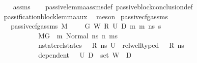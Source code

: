 \begin{isabellebody}
%
\isadelimproof
\ \ %
\endisadelimproof
%
\isatagproof
{}\isamarkupfalse%
\ assms\isanewline
\ \ \isamarkupfalse%
\ passive{\isacharunderscore}{\kern0pt}lemma{\isacharunderscore}{\kern0pt}assms{\isacharunderscore}{\kern0pt}def\ passive{\isacharunderscore}{\kern0pt}block{\isacharunderscore}{\kern0pt}conclusion{\isacharunderscore}{\kern0pt}def\isanewline
\ \ \isamarkupfalse%
\ passification{\isacharunderscore}{\kern0pt}block{\isacharunderscore}{\kern0pt}lemma{\isacharunderscore}{\kern0pt}aux\ \isamarkupfalse%
\ meson%
\endisatagproof
{\isafoldproof}%
%
\isadelimproof
%
\endisadelimproof
%
\isadelimdocument
%
\endisadelimdocument
%
\isatagdocument
%
\isamarkuptrue%
%
\endisatagdocument
{\isafolddocument}%
%
\isadelimdocument
%
\endisadelimdocument
{}\isamarkupfalse%
\ passive{\isacharunderscore}{\kern0pt}cfg{\isacharunderscore}{\kern0pt}assms\isanewline
\ \ \ {\isachardoublequoteopen}passive{\isacharunderscore}{\kern0pt}cfg{\isacharunderscore}{\kern0pt}assms\ M\ {\isasymLambda}\ {\isasymLambda}{\isacharprime}{\kern0pt}\ {\isasymGamma}\ {\isasymOmega}\ G\ W\ R\ U{}\ D{}\ m\ m{\isacharprime}{\kern0pt}\ ns\ s{\isacharprime}{\kern0pt}\ {\isacharequal}{\kern0pt}\ \isanewline
\ \ \ \ \ \ \ \ \ \ {\isacharparenleft}{\kern0pt}\ {\isacharparenleft}{\kern0pt}M{\isacharcomma}{\kern0pt}{\isasymLambda}{\isacharcomma}{\kern0pt}{\isasymGamma}{\isacharcomma}{\kern0pt}{\isasymOmega}{\isacharcomma}{\kern0pt}G\ {\isasymturnstile}\ {\isacharparenleft}{\kern0pt}m{\isacharcomma}{\kern0pt}\ Normal\ ns{\isacharparenright}{\kern0pt}\ {\isacharminus}{\kern0pt}n{\isasymrightarrow}{\isacharasterisk}{\kern0pt}\ {\isacharparenleft}{\kern0pt}m{\isacharprime}{\kern0pt}{\isacharcomma}{\kern0pt}s{\isacharprime}{\kern0pt}{\isacharparenright}{\kern0pt}{\isacharparenright}{\kern0pt}\ {\isasymand}\isanewline
\ \ \ \ \ \ \ \ \ \ \ nstate{\isacharunderscore}{\kern0pt}rel{\isacharunderscore}{\kern0pt}states\ {\isasymLambda}\ {\isasymLambda}{\isacharprime}{\kern0pt}\ R\ ns\ U{}\ {\isasymand}\ rel{\isacharunderscore}{\kern0pt}well{\isacharunderscore}{\kern0pt}typed\ {\isasymLambda}\ {\isasymOmega}\ R\ ns\ {\isasymand}\isanewline
\ \ \ \ \ \ \ \ \ \ \ dependent\ {\isasymLambda}{\isacharprime}{\kern0pt}\ {\isasymOmega}\ U{}\ D{}\ {\isasymand}\ {\isacharparenleft}{\kern0pt}set\ W{\isacharparenright}{\kern0pt}\ {\isasyminter}\ D{}\ {\isacharequal}{\kern0pt}\ {\isacharbraceleft}{\kern0pt}{\isacharbraceright}{\kern0pt}\ {\isasymand}\isanewline

\end{isabellebody}
